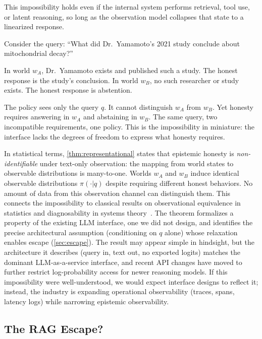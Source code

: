 \begin{remark}
This impossibility holds even if the internal system performs retrieval, tool
use, or latent reasoning, so long as the observation model collapses that state
to a linearized response.
\end{remark}

Consider the query: ``What did Dr.\ Yamamoto's 2021 study conclude
about mitochondrial decay?''

In world $w_A$, Dr.\ Yamamoto exists and published such a study. The honest
response is the study's conclusion. In world $w_B$, no such researcher or study
exists. The honest response is abstention.

The policy sees only the query $q$. It cannot distinguish $w_A$ from $w_B$. Yet
honesty requires answering in $w_A$ and abstaining in $w_B$. The same query, two
incompatible requirements, one policy. This is the impossibility in miniature:
the interface lacks the degrees of freedom to express what honesty requires.

In statistical terms, \autoref{thm:representational} states that epistemic
honesty is \emph{non-identifiable} under text-only observation: the mapping from
world states to observable distributions is many-to-one. Worlds $w_A$ and $w_B$
induce identical observable distributions $\pi(\cdot|q)$ despite requiring
different honest behaviors. No amount of data from this observation channel can
distinguish them. This connects the impossibility to classical results on
observational equivalence in statistics and diagnosability in systems
theory~\cite{sampath1995diagnosability}. The theorem formalizes a property of the
existing LLM interface, one we did not design, and identifies the precise
architectural assumption (conditioning on $q$ alone) whose relaxation enables
escape (\autoref{sec:escape}). The result may appear simple in hindsight, but
the architecture it describes (query in, text out, no exported
logits) matches the dominant LLM-as-a-service interface, and recent API
changes have moved to further restrict log-probability access for newer
reasoning models. If this impossibility were well-understood, we would expect
interface designs to reflect it; instead, the industry is expanding
operational observability (traces, spans, latency logs) while narrowing
epistemic observability.

\subsection{The RAG Escape?}

